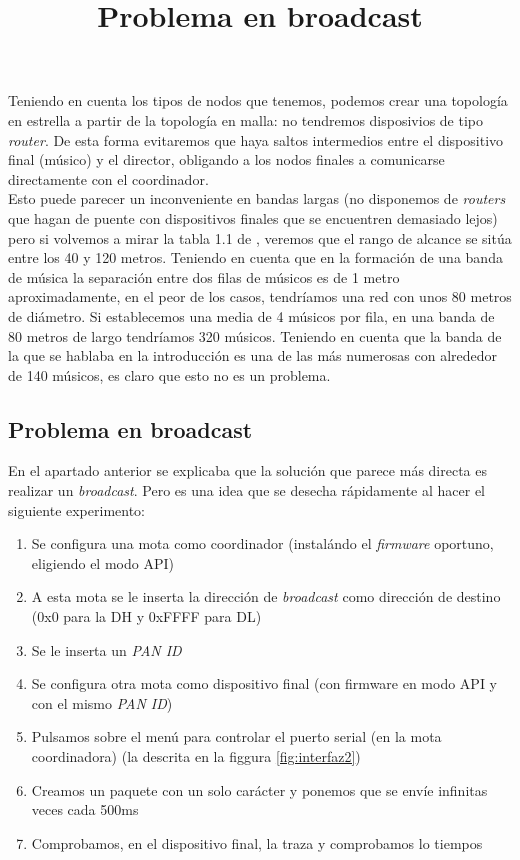 Teniendo en cuenta los tipos de nodos que tenemos, podemos crear una topología en estrella
a partir de la topología en malla: no tendremos
disposivios de tipo \textit{router}. De esta forma evitaremos que haya saltos intermedios entre
el dispositivo final (músico) y el director, obligando a los nodos finales a comunicarse directamente
con el coordinador.\\

Esto puede parecer un inconveniente en bandas largas (no disponemos de \textit{routers}
que hagan de puente con dispositivos finales que se encuentren demasiado lejos)
pero si volvemos a mirar la tabla 1.1 de \cite{faludi}, veremos que el rango
de alcance se sitúa entre los 40 y 120 metros. Teniendo en cuenta que en la
formación de una banda de música la separación entre dos filas de músicos es de
1 metro aproximadamente, en el peor de los casos, tendríamos una red con unos 80 metros de diámetro.
Si establecemos una media de 4 músicos por fila, en una banda de 80 metros de largo tendríamos 320 músicos.
Teniendo en cuenta que la banda de la que se hablaba en la introducción \cite{cigarreras}
es una de las más numerosas con alrededor de 140 músicos, es claro que esto no es
un problema.\\

\subsection{Problema en broadcast}
\title{Problema en broadcast}
\label{subsec:problemabroadcast}

En el apartado anterior se explicaba que la solución que parece más directa es realizar
un \textit{broadcast}. Pero es una idea que se desecha rápidamente al hacer el siguiente experimento:

\begin{enumerate}
  \item Se configura una mota como coordinador (instalándo el \textit{firmware} oportuno, eligiendo el modo API)
  \item A esta mota se le inserta la dirección de \textit{broadcast} como
  dirección de destino (0x0 para la DH y 0xFFFF para DL)
  \item Se le inserta un \textit{PAN ID}
  \item Se configura otra mota como dispositivo final (con firmware en modo API
  y con el mismo \textit{PAN ID})
  \item Pulsamos sobre el menú para controlar el puerto serial (en la mota coordinadora)
  (la descrita en la figgura \ref{fig:interfaz2})
  \item Creamos un paquete con un solo carácter y ponemos que se envíe infinitas veces
  cada 500ms
  \item Comprobamos, en el dispositivo final, la traza y comprobamos lo tiempos
\end{enumerate}

